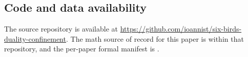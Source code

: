 \documentclass[11pt]{article}
\theoremstyle{definition}
\begin{document}
\subsection*{Code and data availability}

The source repository is available at
\url{https://github.com/ioannist/six-birds-duality-confinement}.
The math source of record for this paper is
 within
that repository, and the per-paper formal manifest is
.
 
\clearpage


\end{document}
